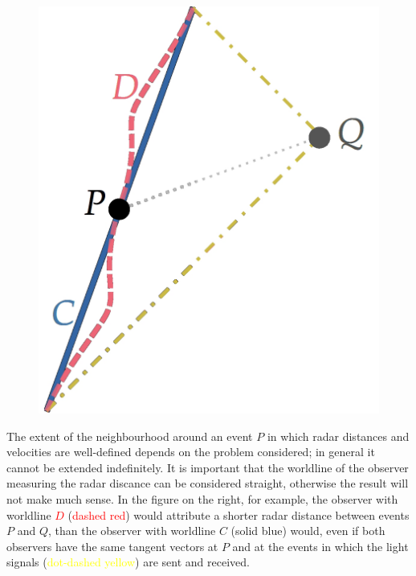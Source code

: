 \documentclass[\ifafour a4paper,12pt,\else a5paper,10pt,\fi%
onecolumn,oneside,article,%
british%
]{memoir}
\theoremstyle{remark}
\theoremstyle{innote}
\renewcommand*{\|}[1][]{\nonscript\:#1\vert\nonscript\:\mathopen{}}
\begin{document}
\setlength{\intextsep}{0ex}%
\setlength{\columnsep}{2ex}%
\begin{figure} %
\centering\includegraphics[width=\linewidth]{radar_distance1.jpg}
\end{figure}%
The extent of the neighbourhood around an event $P$ in which radar distances and velocities are well-defined depends on the problem considered; in general it cannot be extended indefinitely. It is important that the worldline of the observer measuring the radar discance can be considered straight, otherwise the result will not make much sense. In the figure on the right, for example, the observer with worldline \textcolor{red}{$D$} (\textcolor{red}{dashed red}) would attribute a shorter radar distance between events $P$ and $Q$, than the observer with worldline \textcolor{bluepurple}{$C$} (\textcolor{bluepurple}{solid blue}) would, even if both observers have the same tangent vectors at $P$ and at the events in which the light signals (\textcolor{yellow}{dot-dashed yellow}) are sent and received.
\end{document}
